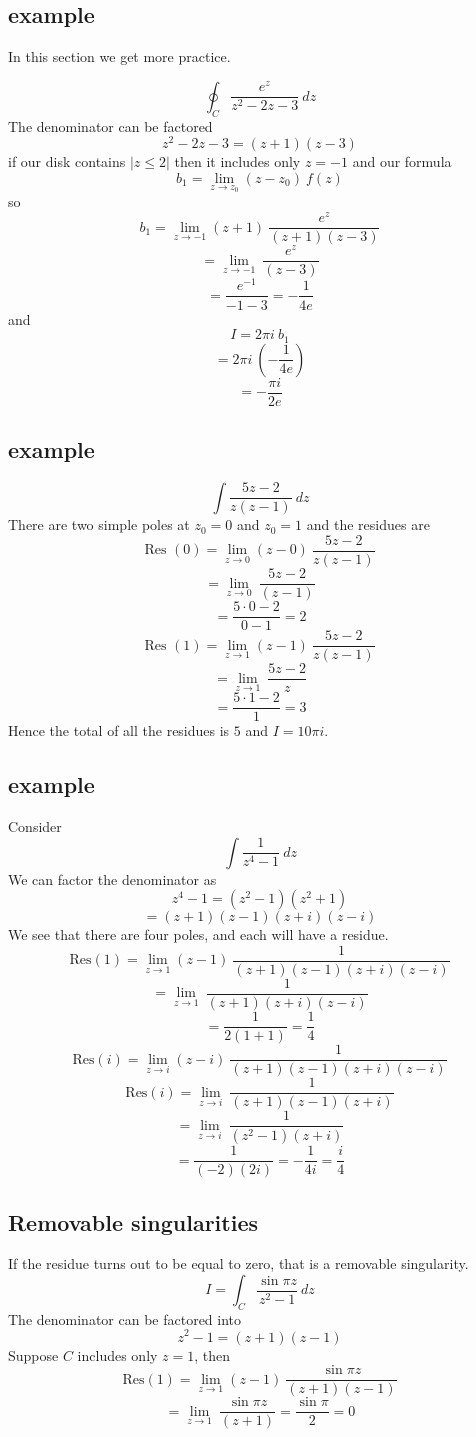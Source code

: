\documentclass[11pt, oneside]{article}
\begin{document}
\subsection*{example}
In this section we get more practice.

\[ \oint_C \frac{e^z}{z^2 - 2z - 3} \ dz \]
The denominator can be factored
\[ z^2 - 2z - 3 = (z + 1)(z - 3) \]
if our disk contains $|z \le 2|$ then it includes only $z = -1$ and our formula
\[ b_1 = \lim_{z \rightarrow z_0} (z-z_0) \ f(z)  \]
so
\[ b_1 = \lim_{z \rightarrow -1} (z+1) \ \frac{e^z}{(z + 1)(z - 3)}  \]
\[ = \lim_{z \rightarrow -1} \ \frac{e^z}{(z - 3)}  \]
\[ = \frac{e^{-1}}{-1 - 3} = - \frac{1}{4 e} \]
and
\[ I = 2 \pi i \ b_1 \]
\[ = 2 \pi i \ (- \frac{1}{4 e}) \]
\[ = - \frac{\pi i}{2 e} \]

\subsection*{example}
\[ \int \frac{5z-2}{z(z-1)} \ dz \]
There are two simple poles at $z_0 = 0$ and $z_0 = 1$ and the residues are
\[ \text{Res }(0) = \lim_{z \rightarrow 0} (z - 0) \ \frac{5z-2}{z(z-1)} \]
\[ = \lim_{z \rightarrow 0} \ \frac{5z-2}{(z-1)} \]
\[ = \frac{5 \cdot 0 - 2}{0 - 1} = 2 \]
\[ \text{Res }(1) = \lim_{z \rightarrow 1} (z - 1) \ \frac{5z-2}{z(z-1)} \]
\[ = \lim_{z \rightarrow 1} \ \frac{5z-2}{z} \]
\[ = \frac{5 \cdot 1 - 2}{1} = 3 \]
Hence the total of all the residues is $5$ and $I = 10 \pi i$.

\subsection*{example}
Consider
\[ \int \frac{1}{z^4 - 1} \ dz \]
We can factor the denominator as
\[ z^4 - 1 = (z^2 - 1)(z^2 + 1) \]
\[ = (z+1)(z-1)(z+i)(z-i) \]
We see that there are four poles, and each will have a residue.
\[ \text{Res}(1) =  \lim_{z \rightarrow 1} (z-1) \ \frac{1}{(z+1)(z-1)(z+i)(z-i)} \]
\[ =  \lim_{z \rightarrow 1} \ \frac{1}{(z+1)(z+i)(z-i)} \]
\[ = \frac{1}{2(1+1)} = \frac{1}{4} \]
\[ \text{Res}(i) =  \lim_{z \rightarrow i} (z-i) \ \frac{1}{(z+1)(z-1)(z+i)(z-i)} \]
\[ \text{Res}(i) =  \lim_{z \rightarrow i} \ \frac{1}{(z+1)(z-1)(z+i)} \]
\[ =  \lim_{z \rightarrow i} \ \frac{1}{(z^2 - 1)(z+i)} \]
\[ = \frac{1}{(-2)(2i)} = -\frac{1}{4i} = \frac{i}{4}  \]

\subsection*{Removable singularities}
If the residue turns out to be equal to zero, that is a removable singularity.  
\[ I = \int_C \frac{\sin \pi z}{z^2 - 1} \ dz \]
The denominator can be factored into 
\[ z^2 - 1 = (z + 1)(z - 1) \]
Suppose $C$ includes only $z = 1$, then
\[ \text{Res}(1) = \lim_{z \rightarrow 1}  (z-1) \ \frac{\sin \pi z}{(z + 1)(z - 1)} \]
\[ = \lim_{z \rightarrow 1} \ \frac{\sin \pi z}{(z + 1)} = \frac{\sin \pi}{2} =  0 \]
\end{document}
